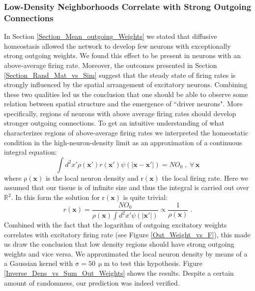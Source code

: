 \documentclass[10pt,a4paper]{article}
\begin{document}
\subsubsection{Low-Density Neighborhoods Correlate with Strong Outgoing Connections}
In Section \ref{Section_Mean_outgoing_Weights} we stated that diffusive homeostasis allowed the network to develop few neurons with exceptionally strong outgoing weights. We found this effect to be present in neurons with an above-average firing rate. Moreover, the outcomes presented in Section \ref{Section_Rand_Mat_vs_Sim} suggest that the steady state of firing rates is strongly influenced by the spatial arrangement of excitatory neurons. Combining these two qualities led us the conclusion that one should be able to observe some relation between spatial structure and the emergence of ``driver neurons". More specifically, regions of neurons with above average firing rates should develop stronger outgoing connections. To get an intuitive understanding of what characterizes regions of above-average firing rates we interpreted the homeostatic condition in the high-neuron-density limit as an approximation of a continuous integral equation:
\begin{equation}
\int d^2 x' \rho(\mathbf{x}') r(\mathbf{x}') \psi(|\mathbf{x}-\mathbf{x}'|) = NO_0 \; , \; \forall \, \mathbf{x}
\label{Density_Limit_Hom}
\end{equation}
where $\mathrm{\rho(\mathbf{x})}$ is the local neuron density and $\mathrm{r(\mathbf{x})}$ the local firing rate. Here we assumed that our tissue is of infinite size and thus the integral is carried out over $\mathbb{R}^2$. In this form the solution for $\mathrm{r(\mathbf{x})}$ is quite trivial:
\begin{equation}
r(\mathbf{x}) = \frac{NO_0}{\rho(\mathbf{x}) \int d^2 x' \psi(|\mathbf{x}'|)} \propto \frac{1}{\rho(\mathbf{x})} \; .
\label{Density_Limit_Hom_Solution}
\end{equation}
Combined with the fact that the logarithm of outgoing excitatory weights correlates with excitatory firing rate (see Figure \ref{Out_Weight_vs_F}), this made us draw the conclusion that low density regions should have strong outgoing weights and vice versa. We approximated the local neuron density by means of a a Gaussian kernel with $\mathrm{\sigma = 50\, \upmu m}$ to test this hypothesis. Figure \ref{Inverse_Dens_vs_Sum_Out_Weights} shows the results. Despite a certain amount of randomness, our prediction was indeed verified. 
\end{document}
